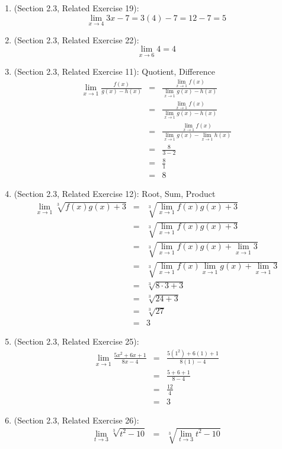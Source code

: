 \documentclass{article}
\begin{document}
\begin{enumerate}
    \item (Section 2.3, Related Exercise 19):
	    $$\lim_{x \to 4}{3x-7} = 3(4)-7 = 12 - 7 = 5$$
    \item (Section 2.3, Related Exercise 22):
	    $$\lim_{x \to 6}{4} = 4$$
    \item (Section 2.3, Related Exercise 11): Quotient, Difference
	    \begin{eqnarray}
	    \lim_{x \to 1}{\frac{f(x)}{g(x) - h(x)}} &=& \frac{\lim\limits_{x \to 1}{f(x)}}{\lim\limits_{x \to 1}{g(x) - h(x)}} \\
	    &=& \frac{\lim\limits_{x \to 1}{f(x)}}{\lim\limits_{x \to 1}{g(x) - h(x)}} \\
	    &=& \frac{\lim\limits_{x \to 1}{f(x)}}{\lim\limits_{x \to 1}{g(x)} - \lim\limits_{x \to 1}h(x)} \\
	    &=& \frac{8}{3 - 2} \\
	    &=& \frac{8}{1} \\
	    &=& 8
	    \end{eqnarray}
    \item (Section 2.3, Related Exercise 12): Root, Sum, Product
	    \begin{eqnarray}
	    \lim_{x \to 1}{\sqrt[3]{f(x)g(x) + 3}} &=& \sqrt[3]{\lim_{x \to 1}{f(x)g(x) + 3}} \\
	    &=& \sqrt[3]{\lim_{x \to 1}{f(x)g(x) + 3}} \\
	    &=& \sqrt[3]{\lim_{x \to 1}{f(x)g(x)} + \lim_{x \to 1}{3}} \\
	    &=& \sqrt[3]{\lim_{x \to 1}{f(x)}\lim_{x \to 1}{g(x)} + \lim_{x \to 1}{3}} \\
	    &=& \sqrt[3]{8 \cdot 3 + 3} \\
	    &=& \sqrt[3]{24 + 3} \\
	    &=& \sqrt[3]{27} \\
	    &=& 3
	    \end{eqnarray}
    \item (Section 2.3, Related Exercise 25):
	    \begin{eqnarray}
	    \lim_{x \to 1}{\frac{5x^2+6x+1}{8x-4}} &=& \frac{5(1^2)+6(1)+1}{8(1)-4} \\
	    &=& \frac{5+6+1}{8-4} \\
	    &=& \frac{12}{4} \\
	    &=& 3
	    \end{eqnarray}
    \item (Section 2.3, Related Exercise 26):
	    \begin{eqnarray}
	    \lim_{t \to 3}{\sqrt[3]{t^2-10}} &=& \sqrt[3]{\lim_{t \to 3}{t^2-10}} \\

\end{eqnarray}
\end{enumerate}
\end{document}
